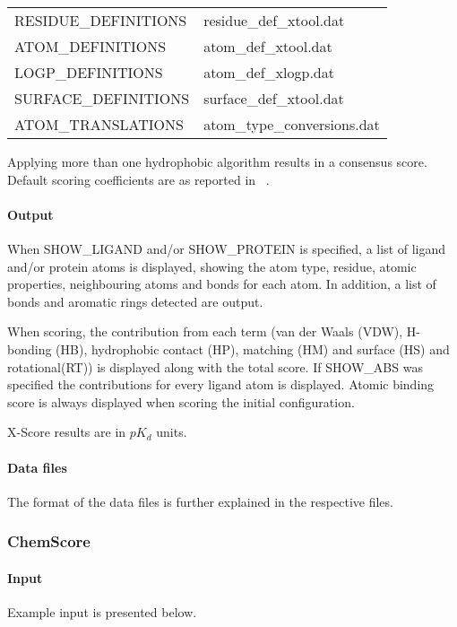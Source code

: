 \documentclass[a4paper,11pt]{article}
\let\origcite\cite
\def\cite#1{\unskip~\origcite{#1}}
\begin{document}
    \begin{tabular}{ll}
    RESIDUE\_DEFINITIONS &   residue\_def\_xtool.dat      \\
    ATOM\_DEFINITIONS    &   atom\_def\_xtool.dat         \\
    LOGP\_DEFINITIONS    &   atom\_def\_xlogp.dat         \\
    SURFACE\_DEFINITIONS &   surface\_def\_xtool.dat      \\
    ATOM\_TRANSLATIONS   &   atom\_type\_conversions.dat  \\
    \end{tabular}

Applying more than one hydrophobic algorithm results in a consensus score. Default scoring coefficients are as reported in \cite{Wang2002}.

  \paragraph{Output}
  When SHOW\_LIGAND and/or SHOW\_PROTEIN is specified, a list of ligand and/or protein atoms is displayed, showing the atom type, residue, atomic properties, neighbouring atoms and bonds for each atom. In  addition, a list of bonds and aromatic rings detected are output.

  When scoring, the contribution from each term (van der Waals (VDW), H-bonding (HB), hydrophobic contact (HP), matching (HM) and surface (HS) and rotational(RT)) is displayed along with the total score. If SHOW\_ABS was specified the contributions for every ligand atom is displayed.
  Atomic binding score is always displayed when scoring the initial configuration.

  X-Score results are in $pK_d$ units.

  \paragraph{Data files}
  The format of the data files is further explained in the respective files.


\subsubsection{ChemScore}

\paragraph{Input}
  Example input is presented below.
\end{document}
